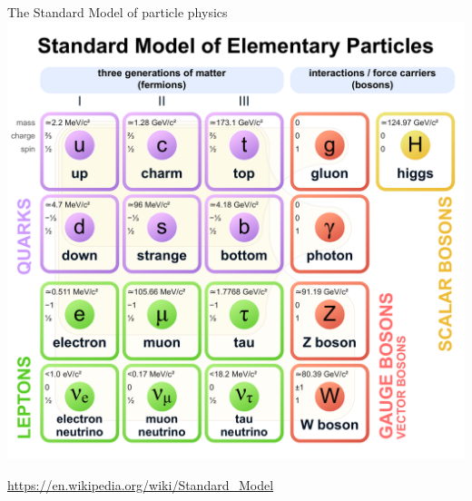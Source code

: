 \documentclass[aspectratio=1610, 10pt]{beamer}
\begin{document}
\begin{frame}{The Standard Model of particle physics}
  \centering
  \includegraphics[height=0.9\textheight]{images/standard_model.pdf}

  \tiny \url{https://en.wikipedia.org/wiki/Standard_Model}
\end{frame}
\end{document}

